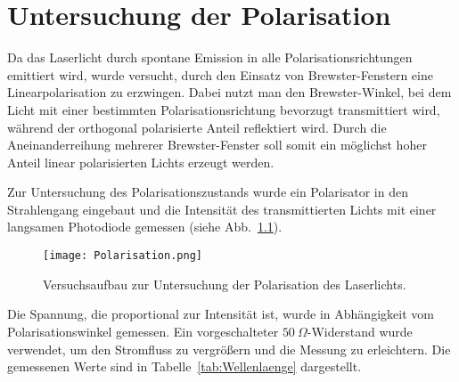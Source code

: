 \chapter{Untersuchung der Polarisation}

Da das Laserlicht durch spontane Emission in alle Polarisationsrichtungen emittiert wird, wurde versucht, durch den Einsatz von Brewster-Fenstern eine Linearpolarisation zu erzwingen. 
Dabei nutzt man den Brewster-Winkel, bei dem Licht mit einer bestimmten Polarisationsrichtung bevorzugt transmittiert wird, während der orthogonal polarisierte Anteil reflektiert wird. 
Durch die Aneinanderreihung mehrerer Brewster-Fenster soll somit ein möglichst hoher Anteil linear polarisierten Lichts erzeugt werden.


Zur Untersuchung des Polarisationszustands wurde ein Polarisator in den Strahlengang eingebaut und die Intensität des transmittierten Lichts mit einer langsamen Photodiode gemessen (siehe Abb.~\ref{fig:Polar}).


\begin{figure}[H]
    \centering
    \texttt{[image: Polarisation.png]}
    \caption{Versuchsaufbau zur Untersuchung der Polarisation des Laserlichts. \cite{praktikum}}
   \label{fig:Polar}
\end{figure}

Die Spannung, die proportional zur Intensität ist, wurde in Abhängigkeit vom Polarisationswinkel gemessen. 
Ein vorgeschalteter $50~\Omega$-Widerstand wurde verwendet, um den Stromfluss zu vergrößern und die Messung zu erleichtern. 
Die gemessenen Werte sind in Tabelle~\ref{tab:Wellenlaenge} dargestellt.

